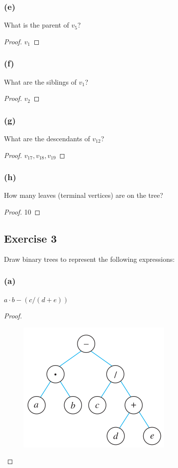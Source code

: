 \documentclass[14pt]{extarticle}
\begin{document}
\subsubsection{(e)}
What is the parent of \(v_5\)?
\begin{proof}
\(v_1\)
\end{proof}

\subsubsection{(f)}
What are the siblings of \(v_1\)?
\begin{proof}
\(v_2\)
\end{proof}

\subsubsection{(g)}
What are the descendants of \(v_{12}\)?
\begin{proof}
\(v_{17}, v_{18}, v_{19}\)
\end{proof}

\subsubsection{(h)}
How many leaves (terminal vertices) are on the tree?
\begin{proof}
10
\end{proof}

\subsection{Exercise 3}
Draw binary trees to represent the following expressions:

\subsubsection{(a)}
\(a \cdot b - (c/(d + e))\)

\begin{proof}
\begin{figure}[ht!]
\centering
\includegraphics[scale=0.5]{../images/10.5.3.a.png}
\end{figure}
\end{proof}
\end{document}
